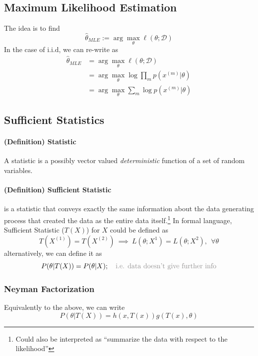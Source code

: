 \documentclass[11pt]{article}
\newcommand{\argmax}{\arg\max}
\begin{document}
\subsection{Maximum Likelihood Estimation}
The idea is to find
\begin{equation*}
    \hat{\theta}_{MLE} := \argmax_\theta \ell(\theta; \mathcal{D})
\end{equation*}
In the case of i.i.d, we can re-write as
\begin{align*}
    \hat{\theta}_{MLE} &= \argmax_\theta \ell(\theta; \mathcal{D})\\
    &= \argmax_\theta \log \prod_{m} p\left(x^{(m)} | \theta\right) \\
    &= \argmax_\theta\sum_{m} \log p\left(x^{(m)} | \theta\right)
\end{align*}

\subsection{Sufficient Statistics}
\paragraph{(Definition) Statistic}
A statistic is a possibly vector valued \textit{deterministic} function of a set of random variables.

\paragraph{(Definition) Sufficient Statistic} 
is a statistic that conveys exactly the same information about the data generating process that created the data as the entire data itself.\footnote{Could also be interpreted as ``summarize the data with respect to the likelihood''} In formal language, Sufficient Statistic ($T(X)$) for $X$ could be defined as
\begin{equation*}
    T(X^{(1)}) = T(X^{(2)})~ \implies~ L(\theta; X^{1}) = L(\theta; X^{2}), ~~\forall \theta
\end{equation*}
alternatively, we can define it as
\begin{equation*}
    P(\theta | T(X)) = P(\theta | X); ~~~\text{\color{Gray} i.e. data doesn't give further info}
\end{equation*}
\subsubsection{Neyman Factorization}
Equivalently to the above, we can write
\begin{equation*}
    P(\theta | T(X))=h(x, T(x)) g(T(x), \theta)
\end{equation*}
\end{document}
